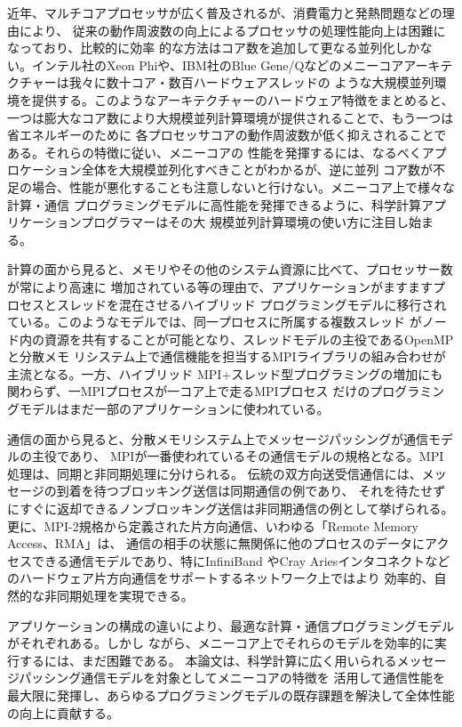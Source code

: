 近年、マルチコアプロセッサが広く普及されるが、消費電力と発熱問題などの理由により、
従来の動作周波数の向上によるプロセッサの処理性能向上は困難になっており、比較的に効率
的な方法はコア数を追加して更なる並列化しかない。インテル社のXeon Phiや、IBM社のBlue 
Gene/Qなどのメニーコアアーキテクチャーは我々に数十コア・数百ハードウェアスレッドの
ような大規模並列環境を提供する。このようなアーキテクチャーのハードウェア特徴をまとめると、
一つは膨大なコア数により大規模並列計算環境が提供されることで、もう一つは省エネルギーのために
各プロセッサコアの動作周波数が低く抑えされることである。それらの特徴に従い、メニーコアの
性能を発揮するには、なるべくアプロケーション全体を大規模並列化すべきことがわかるが、逆に並列
コア数が不足の場合、性能が悪化することも注意しないと行けない。メニーコア上で様々な計算・通信
プログラミングモデルに高性能を発揮できるように、科学計算アプリケーションプログラマーはその大
規模並列計算環境の使い方に注目し始まる。

計算の面から見ると、メモリやその他のシステム資源に比べて、プロセッサー数が常により高速に
増加されている等の理由で、アプリケーションがますますプロセスとスレッドを混在させるハイブリッド
プログラミングモデルに移行されている。このようなモデルでは、同一プロセスに所属する複数スレッド
がノード内の資源を共有することが可能となり、スレッドモデルの主役であるOpenMPと分散メモ
リシステム上で通信機能を担当するMPIライブラリの組み合わせが主流となる。一方、ハイブリッド
MPI+スレッド型プログラミングの増加にも関わらず、一MPIプロセスが一コア上で走るMPIプロセス
だけのプログラミングモデルはまだ一部のアプリケーションに使われている。

通信の面から見ると、分散メモリシステム上でメッセージパッシングが通信モデルの主役であり、
MPIが一番使われているその通信モデルの規格となる。MPI処理は、同期と非同期処理に分けられる。
伝統の双方向送受信通信には、メッセージの到着を待つブロッキング送信は同期通信の例であり、
それを待たせずにすぐに返却できるノンブロッキング送信は非同期通信の例として挙げられる。
更に、MPI-2規格から定義された片方向通信、いわゆる「Remote Memory Access、RMA」は、
通信の相手の状態に無関係に他のプロセスのデータにアクセスできる通信モデルであり、特にInfiniBand
やCray Ariesインタコネクトなどのハードウェア片方向通信をサポートするネットワーク上ではより
効率的、自然的な非同期処理を実現できる。

アプリケーションの構成の違いにより、最適な計算・通信プログラミングモデルがそれぞれある。しかし
ながら、メニーコア上でそれらのモデルを効率的に実行するには、まだ困難である。
本論文は、科学計算に広く用いられるメッセージパッシング通信モデルを対象としてメニーコアの特徴を
活用して通信性能を最大限に発揮し、あらゆるプログラミングモデルの既存課題を解決して全体性能の向上に貢献する。


